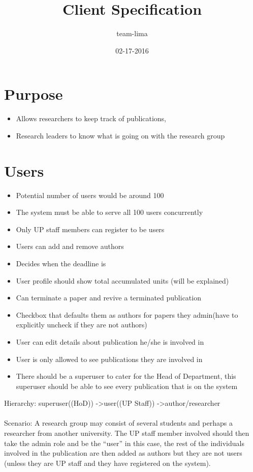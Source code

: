 \documentclass{article}
\title{\Huge Client Specification}
\date{02-17-2016}
\author{team-lima}
\begin{document}
	\maketitle
	\newpage

	\section{Purpose}
	\begin{itemize}
		\item Allows researchers to keep track of publications,
		\item Research leaders to know what is going on with the research group
	\end{itemize}

	\section{Users}
	\begin{itemize}
		\item Potential number of users would be around 100
		\item The system must be able to serve all 100 users concurrently
		\item Only UP staff members can register to be users
		\item Users can add and remove authors
		\item Decides when the deadline is
		\item User profile should show total accumulated units (will be explained)
		\item Can terminate a paper and revive a terminated publication
		\item Checkbox that defaults them as authors for papers they admin(have to explicitly uncheck if they are not authors)
		\item User can edit details about publication he/she is involved in
		\item User is only allowed to see publications they are involved in
		\item There should be a superuser to cater for the Head of Department, this superuser should be able to see every publication that is on the system
	\end{itemize}
	\Large Hierarchy: \normalsize
	superuser((HoD)) -\textgreater  user((UP Staff)) -\textgreater  author/researcher\\
	\\
	\Large Scenario: \normalsize A research group may consist of several students and perhaps a researcher from another university. The UP staff member involved should then take the admin role and be the “user” in this case, the rest of the individuals involved in the publication are then added as authors but they are not users (unless they are UP staff and they have registered on the system).\\
\end{document}
